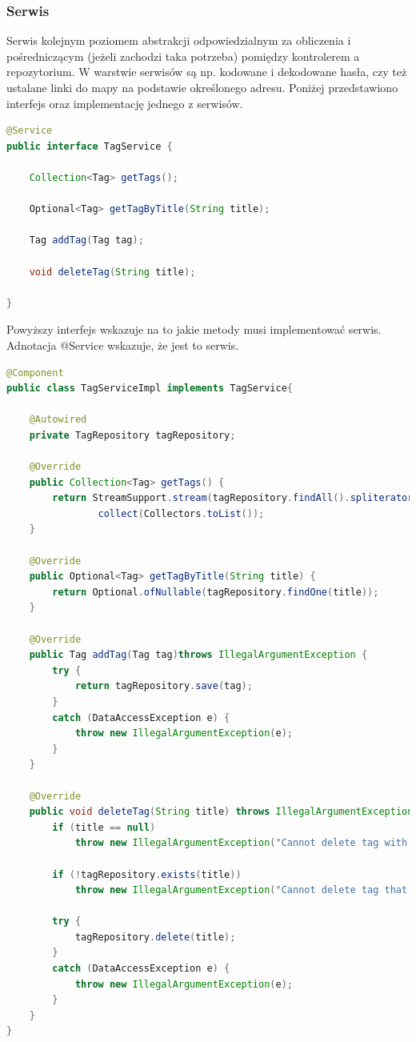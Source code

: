 \documentclass{report}
\begin{document}
			
			\subsubsection{Serwis}
			
Serwis kolejnym poziomem abstrakcji odpowiedzialnym za obliczenia i pośredniczącym (jeżeli zachodzi taka potrzeba) pomiędzy kontrolerem a repozytorium. W warstwie serwisów są np. kodowane i dekodowane hasła, czy też ustalane linki do mapy na podstawie określonego adresu. Poniżej przedstawiono interfejs oraz implementację jednego z serwisów.			

\begin{lstlisting}[language=Java, breaklines]
@Service
public interface TagService {

    Collection<Tag> getTags();

    Optional<Tag> getTagByTitle(String title);

    Tag addTag(Tag tag);

    void deleteTag(String title);

}
\end{lstlisting}

Powyższy interfejs wskazuje na to jakie metody musi implementować serwis. Adnotacja @Service wskazuje, że jest to serwis.

\begin{lstlisting}[language=Java, breaklines]
@Component
public class TagServiceImpl implements TagService{

    @Autowired
    private TagRepository tagRepository;

    @Override
    public Collection<Tag> getTags() {
        return StreamSupport.stream(tagRepository.findAll().spliterator(), false).
                collect(Collectors.toList());
    }

    @Override
    public Optional<Tag> getTagByTitle(String title) {
        return Optional.ofNullable(tagRepository.findOne(title));
    }

    @Override
    public Tag addTag(Tag tag)throws IllegalArgumentException {
        try {
            return tagRepository.save(tag);
        }
        catch (DataAccessException e) {
            throw new IllegalArgumentException(e);
        }
    }

    @Override
    public void deleteTag(String title) throws IllegalArgumentException {
        if (title == null)
            throw new IllegalArgumentException("Cannot delete tag with unspecified title");

        if (!tagRepository.exists(title))
            throw new IllegalArgumentException("Cannot delete tag that does not exist");

        try {
            tagRepository.delete(title);
        }
        catch (DataAccessException e) {
            throw new IllegalArgumentException(e);
        }
    }
}
\end{lstlisting}
\end{document}
